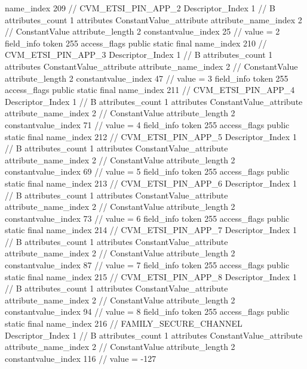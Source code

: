 {{{{{				name_index	209		// CVM_ETSI_PIN_APP_2
				Descriptor_Index	1		// B
				attributes_count	1
				attributes {
				ConstantValue_attribute {
					attribute_name_index	2		// ConstantValue
					attribute_length	2
					constantvalue_index	25		// value = 2
				}
				}
			}
			field_info {
				token	255
				access_flags	public static final
				name_index	210		// CVM_ETSI_PIN_APP_3
				Descriptor_Index	1		// B
				attributes_count	1
				attributes {
				ConstantValue_attribute {
					attribute_name_index	2		// ConstantValue
					attribute_length	2
					constantvalue_index	47		// value = 3
				}
				}
			}
			field_info {
				token	255
				access_flags	public static final
				name_index	211		// CVM_ETSI_PIN_APP_4
				Descriptor_Index	1		// B
				attributes_count	1
				attributes {
				ConstantValue_attribute {
					attribute_name_index	2		// ConstantValue
					attribute_length	2
					constantvalue_index	71		// value = 4
				}
				}
			}
			field_info {
				token	255
				access_flags	public static final
				name_index	212		// CVM_ETSI_PIN_APP_5
				Descriptor_Index	1		// B
				attributes_count	1
				attributes {
				ConstantValue_attribute {
					attribute_name_index	2		// ConstantValue
					attribute_length	2
					constantvalue_index	69		// value = 5
				}
				}
			}
			field_info {
				token	255
				access_flags	public static final
				name_index	213		// CVM_ETSI_PIN_APP_6
				Descriptor_Index	1		// B
				attributes_count	1
				attributes {
				ConstantValue_attribute {
					attribute_name_index	2		// ConstantValue
					attribute_length	2
					constantvalue_index	73		// value = 6
				}
				}
			}
			field_info {
				token	255
				access_flags	public static final
				name_index	214		// CVM_ETSI_PIN_APP_7
				Descriptor_Index	1		// B
				attributes_count	1
				attributes {
				ConstantValue_attribute {
					attribute_name_index	2		// ConstantValue
					attribute_length	2
					constantvalue_index	87		// value = 7
				}
				}
			}
			field_info {
				token	255
				access_flags	public static final
				name_index	215		// CVM_ETSI_PIN_APP_8
				Descriptor_Index	1		// B
				attributes_count	1
				attributes {
				ConstantValue_attribute {
					attribute_name_index	2		// ConstantValue
					attribute_length	2
					constantvalue_index	94		// value = 8
				}
				}
			}
			field_info {
				token	255
				access_flags	public static final
				name_index	216		// FAMILY_SECURE_CHANNEL
				Descriptor_Index	1		// B
				attributes_count	1
				attributes {
				ConstantValue_attribute {
					attribute_name_index	2		// ConstantValue
					attribute_length	2
					constantvalue_index	116		// value = -127
}}}}}}}
